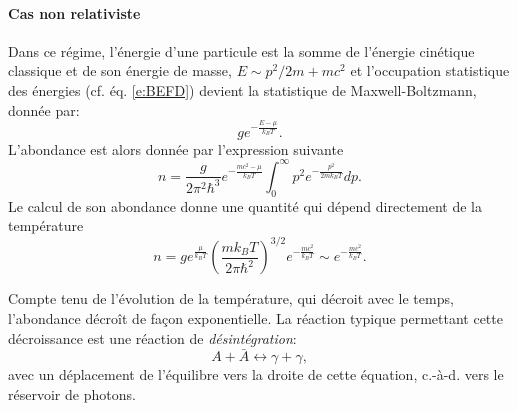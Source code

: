\paragraph{Cas non relativiste}
Dans ce régime, l'énergie d'une particule est la somme de l'énergie cinétique classique et de son énergie de masse, $E\sim p^2/2m +mc^2$ et l'occupation statistique des énergies (cf. éq. \ref{e:BEFD}) devient la statistique de  Maxwell-Boltzmann, donnée par:
\begin{equation}
g e^{-\frac{E-\mu}{k_B T}}.
\end{equation}
 L'abondance est alors donnée par l'expression suivante 
\begin{equation}
n=\frac{g}{2\pi^2 \hbar^3}e^{-\frac{mc^2-\mu}{k_BT}}\int_0^\infty p^2 e^{-\frac{p^2}{2mk_B T}}dp.
\end{equation} 
 Le calcul de son abondance donne une quantité qui dépend directement de la température
\begin{equation}
n=ge^{\frac{\mu}{k_BT}}\left(\frac{m k_B T}{2\pi\hbar^2}\right)^{3/2}e^{-\frac{mc^2}{k_B T}}\sim e^{-\frac{mc^2}{k_B T}}.
\label{e:nonrel}
\end{equation}


Compte tenu de l'évolution de la température, qui décroit avec le temps, l'abondance décroît de façon exponentielle. La réaction typique permettant cette décroissance est une réaction de \textit{désintégration}:
\begin{equation}
A+\bar A \leftrightarrow \gamma+\gamma,
\end{equation}
avec un déplacement de l'équilibre vers la droite de cette équation, c.-à-d. vers le réservoir de photons.

